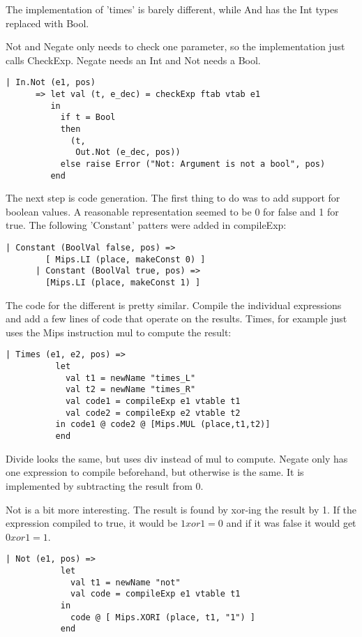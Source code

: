 \documentclass[10pt]{article}
\begin{document}
The implementation of 'times' is barely different, while And has the Int types replaced with Bool. 

Not and Negate only needs to check one parameter, so the implementation just calls CheckExp. Negate needs an Int and Not needs a Bool.

\begin{Verbatim}[frame=single]
   | In.Not (e1, pos)
      => let val (t, e_dec) = checkExp ftab vtab e1
         in
           if t = Bool
           then
             (t,
              Out.Not (e_dec, pos))
           else raise Error ("Not: Argument is not a bool", pos)
         end
\end{Verbatim}

The next step is  code generation. The first thing to do was to add support for boolean values. A reasonable representation seemed to be 0 for false and 
1 for true. The following 'Constant' patters were added in compileExp:

\begin{Verbatim}[frame=single]
      | Constant (BoolVal false, pos) =>
		[ Mips.LI (place, makeConst 0) ] 
      | Constant (BoolVal true, pos) =>
		[Mips.LI (place, makeConst 1) ] 
\end{Verbatim}

The code for the different is pretty similar. Compile the individual expressions and add a few lines of code that operate on the results. Times, for example just uses the Mips instruction mul to compute the result:

\begin{Verbatim}[frame=single]
      | Times (e1, e2, pos) =>
          let
            val t1 = newName "times_L"
            val t2 = newName "times_R"
            val code1 = compileExp e1 vtable t1
            val code2 = compileExp e2 vtable t2
          in code1 @ code2 @ [Mips.MUL (place,t1,t2)]
          end
\end{Verbatim}

Divide looks the same, but uses div instead of mul to compute. Negate only has one expression to compile beforehand, but otherwise is the same. It is implemented by subtracting the result from 0.

Not is a bit more interesting. The result is found by xor-ing the result by 1. If the expression compiled to true, it would be $1 xor 1 = 0$ and if it was false it would get $0 xor 1 = 1$.

\begin{Verbatim}[frame=single]
       | Not (e1, pos) =>
           let
             val t1 = newName "not"
             val code = compileExp e1 vtable t1
           in
             code @ [ Mips.XORI (place, t1, "1") ]
           end
\end{Verbatim}
\end{document}
